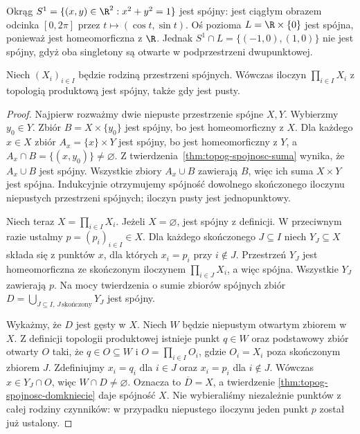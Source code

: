\begin{przyklad}
\label{ex:topog-spojnosc-przeciecie}
Okrąg $S^1=\{(x,y)\in\R^2:x^2+y^2=1\}$
jest spójny: jest ciągłym obrazem odcinka
$[0,2\pi]$ przez $t\mapsto(\cos t,\sin t)$.
Oś pozioma $L=\R\times\{0\}$ jest spójna,
ponieważ jest homeomorficzna z $\R$.
Jednak $S^1\cap L=\{(-1,0),(1,0)\}$
nie jest spójny, gdyż oba singletony są
otwarte w podprzestrzeni dwupunktowej.
\end{przyklad}

\begin{twierdzenie}
\label{thm:topog-spojnosc-iloczyn}
Niech $(X_i)_{i\in I}$ będzie rodziną
przestrzeni spójnych. Wówczas iloczyn
$\prod_{i\in I}X_i$ z topologią produktową
jest spójny, także gdy jest pusty.
\end{twierdzenie}
\begin{proof}
Najpierw rozważmy dwie niepuste przestrzenie
spójne $X,Y$. Wybierzmy $y_0\in Y$.
Zbiór $B=X\times\{y_0\}$ jest spójny,
bo jest homeomorficzny z $X$.
Dla każdego $x\in X$ zbiór
$A_x=\{x\}\times Y$ jest spójny,
bo jest homeomorficzny z $Y$, a
$A_x\cap B=\{(x,y_0)\}\ne\varnothing$.
Z twierdzenia~\ref{thm:topog-spojnosc-suma}
wynika, że $A_x\cup B$ jest spójny.
Wszystkie zbiory $A_x\cup B$ zawierają $B$,
więc ich suma $X\times Y$ jest spójna.
Indukcyjnie otrzymujemy spójność dowolnego
skończonego iloczynu niepustych przestrzeni
spójnych; iloczyn pusty jest jednopunktowy.

Niech teraz $X=\prod_{i\in I}X_i$.
Jeżeli $X=\varnothing$, jest spójny z definicji.
W przeciwnym razie ustalmy $p=(p_i)_{i\in I}\in X$.
Dla każdego skończonego $J\subseteq I$
niech $Y_J\subseteq X$ składa się z punktów
$x$, dla których $x_i=p_i$ przy $i\notin J$.
Przestrzeń $Y_J$ jest homeomorficzna ze
skończonym iloczynem $\prod_{i\in J}X_i$,
a więc spójna. Wszystkie $Y_J$ zawierają $p$.
Na mocy twierdzenia o sumie zbiorów spójnych
zbiór $D=\bigcup_{J\subseteq I,\,J\,\text{skończony}}Y_J$
jest spójny.

Wykażmy, że $D$ jest gęsty w $X$.
Niech $W$ będzie niepustym otwartym zbiorem
w $X$. Z definicji topologii produktowej
istnieje punkt $q\in W$ oraz podstawowy
zbiór otwarty $O$ taki, że $q\in O\subseteq W$
i $O=\prod_{i\in I}O_i$, gdzie $O_i=X_i$
poza skończonym zbiorem $J$. Zdefiniujmy
$x_i=q_i$ dla $i\in J$ oraz $x_i=p_i$
dla $i\notin J$. Wówczas $x\in Y_J\cap O$,
więc $W\cap D\ne\varnothing$.
Oznacza to $\overline D=X$, a twierdzenie
\ref{thm:topog-spojnosc-domkniecie}
daje spójność $X$. Nie wybieraliśmy
niezależnie punktów z całej rodziny czynników:
w przypadku niepustego iloczynu jeden punkt
$p$ został już ustalony.
\end{proof}

